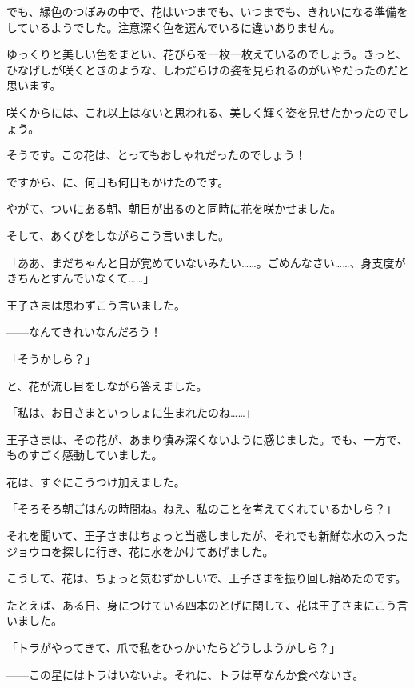 
でも、緑色のつぼみの中で、花はいつまでも、いつまでも、きれいになる準備をしているようでした。注意深く色を選んでいるに違いありません。

ゆっくりと美しい色をまとい、花びらを一枚一枚えているのでしょう。きっと、ひなげしが咲くときのような、しわだらけの姿を見られるのがいやだったのだと思います。

咲くからには、これ以上はないと思われる、美しく輝く姿を見せたかったのでしょう。

そうです。この花は、とってもおしゃれだったのでしょう！

ですから、に、何日も何日もかけたのです。

やがて、ついにある朝、朝日が出るのと同時に花を咲かせました。

そして、あくびをしながらこう言いました。

「ああ、まだちゃんと目が覚めていないみたい……。ごめんなさい……、身支度がきちんとすんでいなくて……」

王子さまは思わずこう言いました。

——なんてきれいなんだろう！

「そうかしら？」


と、花が流し目をしながら答えました。

「私は、お日さまといっしょに生まれたのね……」

王子さまは、その花が、あまり慎み深くないように感じました。でも、一方で、ものすごく感動していました。

花は、すぐにこうつけ加えました。

「そろそろ朝ごはんの時間ね。ねえ、私のことを考えてくれているかしら？」

それを聞いて、王子さまはちょっと当惑しましたが、それでも新鮮な水の入ったジョウロを探しに行き、花に水をかけてあげました。


こうして、花は、ちょっと気むずかしいで、王子さまを振り回し始めたのです。

たとえば、ある日、身につけている四本のとげに関して、花は王子さまにこう言いました。

「トラがやってきて、爪で私をひっかいたらどうしようかしら？」

——この星にはトラはいないよ。それに、トラは草なんか食べないさ。



